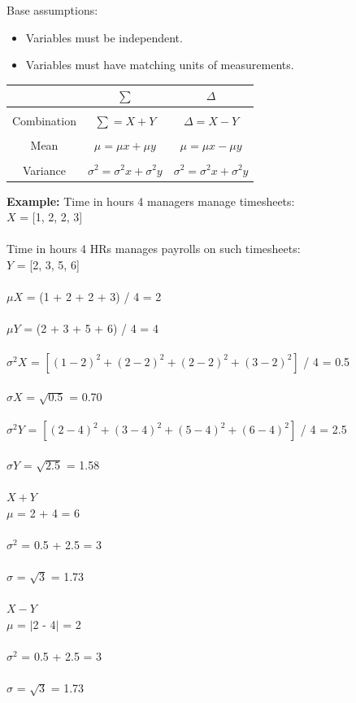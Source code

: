 \documentclass{article}
\begin{document}
Base assumptions:
\begin{itemize}
    \item Variables must be independent.
    \item Variables must have matching units of measurements.
\end{itemize}

\begin{center}
\begin{tabular}{|c|c|c|}
\hline
 & $\sum$ & $\Delta$  \\ \hline
&&\\[-1em]
Combination & $\sum = X + Y $ & $\Delta = X - Y$ \\ \hline
&&\\[-1em]
Mean & $\mu = \mu x + \mu y $ & $\mu = \mu x - \mu y$ \\ \hline
&&\\[-1em]
Variance & $\sigma^2 = \sigma^2 x + \sigma^2 y$ & $\sigma^2 = \sigma^2 x + \sigma^2 y$ \\
\hline
\end{tabular}
\end{center}

\textbf{Example:}
Time in hours 4 managers manage timesheets: \\ 
$X$ = [1, 2, 2, 3] \\ 
\mbox{} \\
Time in hours 4 HRs manages payrolls on such timesheets: \\ 
$Y$ = [2, 3, 5, 6] \\ 
\mbox{} \\

$\mu X$ = (1 + 2 + 2 + 3) / 4 = 2 \\
\mbox{} \\
$\mu Y$ = (2 + 3 + 5 + 6) / 4 = 4 \\ 
\mbox{} \\
$\sigma^2 X$ = $[(1 - 2)^2 + (2 - 2)^2 + (2 - 2)^2 + (3 - 2)^2 ]$ / 4 = 0.5  \\
\mbox{} \\
$\sigma X$ =  $\sqrt{0.5}$ = 0.70 \\ 
\mbox{} \\
$\sigma^2 Y$ = $[(2 - 4)^2 + (3 - 4)^2 + (5 - 4)^2 + (6 - 4)^2]$ / 4 = 2.5  \\
\mbox{} \\
$\sigma Y$ =  $\sqrt{2.5}$ = 1.58 \\
\mbox{} \\
$X + Y$ \\
$\mu$ = 2 + 4 = 6 \\
\mbox{} \\
$\sigma^2$ = 0.5 + 2.5 = 3 \\ 
\mbox{} \\
$\sigma$ = $\sqrt{3}$ = 1.73 \\ 
\mbox{} \\
$X - Y$ \\ 
$\mu$ = $|$2 - 4$|$ = 2 \\ 
\mbox{} \\
$\sigma^2$ = 0.5 + 2.5 = 3 \\ 
\mbox{} \\
$\sigma$ = $\sqrt{3}$ = 1.73 \\
\end{document}
